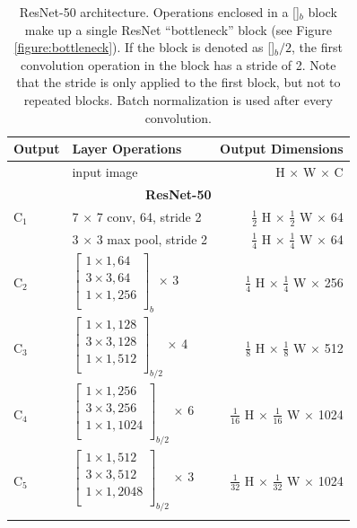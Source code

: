 {
\begin{longtable}{llr}
\toprule
\textbf{Output} & \textbf{Layer Operations} & \textbf{Output Dimensions} \\
\midrule\midrule
 & input image & H $\times$ W $\times$ C \\
\midrule
\multicolumn{3}{c}{\textbf{ResNet-50}}\\
\midrule
C$_1$ & 7 $\times$ 7 conv, 64, stride 2 & $\tfrac{1}{2}$ H $\times$ $\tfrac{1}{2}$ W $\times$ 64 \\

& 3 $\times$ 3 max pool, stride 2 & $\tfrac{1}{4}$ H $\times$ $\tfrac{1}{4}$ W $\times$ 64 \\

C$_2$ &
$\begin{bmatrix}
1 \times 1, 64 \\
3 \times 3, 64 \\
1 \times 1, 256 \\
\end{bmatrix}_b$ $\times$ 3
& $\tfrac{1}{4}$ H $\times$ $\tfrac{1}{4}$ W $\times$ 256 \\
\midrule
C$_3$ &
$\begin{bmatrix}
1 \times 1, 128 \\
3 \times 3, 128 \\
1 \times 1, 512 \\
\end{bmatrix}_{b/2}$ $\times$ 4
& $\tfrac{1}{8}$ H $\times$ $\tfrac{1}{8}$ W $\times$ 512 \\
\midrule
C$_4$ &
$\begin{bmatrix}
1 \times 1, 256 \\
3 \times 3, 256 \\
1 \times 1, 1024 \\
\end{bmatrix}_{b/2}$ $\times$ 6
& $\tfrac{1}{16}$ H $\times$ $\tfrac{1}{16}$ W $\times$ 1024 \\
\midrule
C$_5$ &
$\begin{bmatrix}
1 \times 1, 512 \\
3 \times 3, 512 \\
1 \times 1, 2048 \\
\end{bmatrix}_{b/2}$ $\times$ 3
& $\tfrac{1}{32}$ H $\times$ $\tfrac{1}{32}$ W $\times$ 1024 \\

\bottomrule

\caption {
ResNet-50 \cite{ResNet} architecture.
Operations enclosed in a []$_b$ block make up a single ResNet \enquote{bottleneck}
block (see Figure \ref{figure:bottleneck}). If the block is denoted as []$_b/2$,
the first convolution operation in the block has a stride of 2. Note that the stride
is only applied to the first block, but not to repeated blocks.
Batch normalization \cite{BN} is used after every convolution.
}
\label{table:resnet}
\end{longtable}


}

